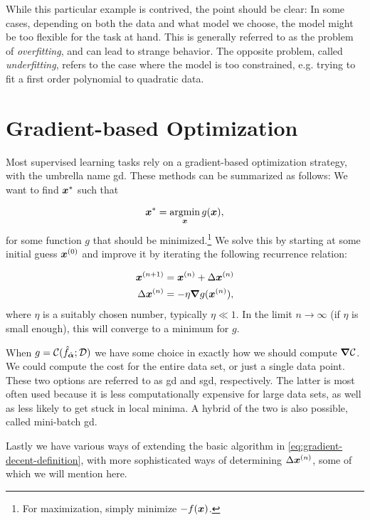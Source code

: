 \documentclass[Thesis.tex]{subfiles}
\begin{document}
While this particular example is contrived, the point should be clear: In
some cases, depending on both the data and what model we choose, the model might
be too flexible for the task at hand. This is generally referred to as the
problem of \emph{overfitting}, and can lead to strange behavior. The opposite
problem, called \emph{underfitting}, refers to the case where the model is too
constrained, e.g. trying to fit a first order polynomial to
quadratic data.



\section{Gradient-based Optimization}
\label{sec:ml-optimization}

Most supervised learning tasks rely on a gradient-based optimization strategy,
with the umbrella name \gls{gd}.
These methods can be summarized as follows: We want to find $\bm{x}^*$ such that

\begin{align}
  \bm{x}^* = \operatorname*{argmin}_{\bm{x}} g(\bm{x}),
\end{align}
for some function $g$ that should be minimized.\footnote{For maximization, simply minimize $-f(\bm{x})$. }
We solve this by starting at some initial guess $\bm{x}^{(0)}$ and improve it by
iterating the following recurrence relation:

\begin{align}
  \begin{split}\label{eq:gradient-decent-definition}
    \bm{x}^{(n+1)} &= \bm{x}^{(n)} + \Delta \bm{x}^{(n)} \\
    \Delta\bm{x}^{(n)} &= -\eta \grad{g}(\bm{x}^{(n)}),
  \end{split}
\end{align}
where $\eta$ is a suitably chosen number, typically $\eta \ll 1$. In the
limit $n\to\infty$ (if $\eta$ is small enough), this will converge to a minimum
for $g$.

When $g=\mathcal{C}(\hat f_{\hat{\bm{\alpha}}}; \mathcal{D})$ we have some choice in
exactly how we should compute $\grad{\mathcal{C}}$. We could compute the cost
for the entire data set, or just a single data point. These two options are
referred to as \gls{gd} and \gls{sgd}, respectively. The latter is most often
used because it is less computationally expensive for large data sets, as well
as less likely to get stuck in local minima. A hybrid of the two is also
possible, called mini-batch \gls{gd}.

Lastly we have various ways of extending the basic algorithm in
\cref{eq:gradient-decent-definition}, with more sophisticated ways of
determining $\Delta \bm{x}^{(n)}$, some of which we will mention here.
\end{document}
